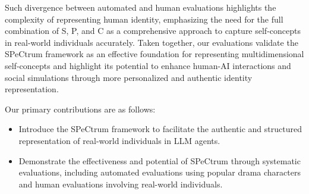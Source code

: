 Such divergence between automated and human evaluations highlights the complexity of representing human identity, emphasizing the need for the full combination of S, P, and C as a comprehensive approach to capture self-concepts in real-world individuals accurately. Taken together, our evaluations validate the SPeCtrum framework as an effective foundation for representing multidimensional self-concepts and highlight its potential to enhance human-AI interactions and social simulations through more personalized and authentic identity representation.


Our primary contributions are as follows:
\begin{itemize}
    \item Introduce the SPeCtrum framework to facilitate the authentic and structured representation of real-world individuals in LLM agents.
    \item Demonstrate the effectiveness and potential of SPeCtrum through systematic evaluations, including automated evaluations using popular drama characters and human evaluations involving real-world individuals.
\end{itemize}

